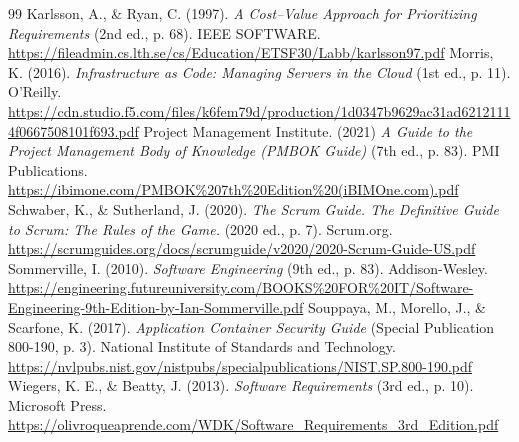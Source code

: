 \begin{thebibliography}{99}
	Karlsson, A., \& Ryan, C. (1997).
	\textit{A Cost–Value Approach for Prioritizing Requirements} (2nd ed., p. 68).
	IEEE SOFTWARE.
	\url{https://fileadmin.cs.lth.se/cs/Education/ETSF30/Labb/karlsson97.pdf}
	Morris, K. (2016).
	\textit{Infrastructure as Code: Managing Servers in the Cloud} (1st ed., p. 11).
	O'Reilly.
	\url{https://cdn.studio.f5.com/files/k6fem79d/production/1d0347b9629ac31ad62121114f0667508101f693.pdf}
	Project Management Institute. (2021)
	\textit{A Guide to the Project Management Body of Knowledge (PMBOK Guide)} (7th ed., p. 83).
	PMI Publications.
	\url{https://ibimone.com/PMBOK%207th%20Edition%20(iBIMOne.com).pdf}
	Schwaber, K., \& Sutherland, J. (2020).
	\textit{The Scrum Guide. The Definitive Guide to Scrum: The Rules of the Game.} (2020 ed., p. 7).
	Scrum.org.
	\url{https://scrumguides.org/docs/scrumguide/v2020/2020-Scrum-Guide-US.pdf}
	Sommerville, I. (2010).
	\textit{Software Engineering} (9th ed., p. 83).
	Addison-Wesley.
	\url{https://engineering.futureuniversity.com/BOOKS%20FOR%20IT/Software-Engineering-9th-Edition-by-Ian-Sommerville.pdf}
	Souppaya, M., Morello, J., \& Scarfone, K. (2017).
	\textit{Application Container Security Guide} (Special Publication 800-190, p. 3).
	National Institute of Standards and Technology.
	\url{https://nvlpubs.nist.gov/nistpubs/specialpublications/NIST.SP.800-190.pdf}
	Wiegers, K. E., \& Beatty, J. (2013).
	\textit{Software Requirements} (3rd ed., p. 10).
	Microsoft Press.
	\url{https://olivroqueaprende.com/WDK/Software_Requirements_3rd_Edition.pdf}
\end{thebibliography}

